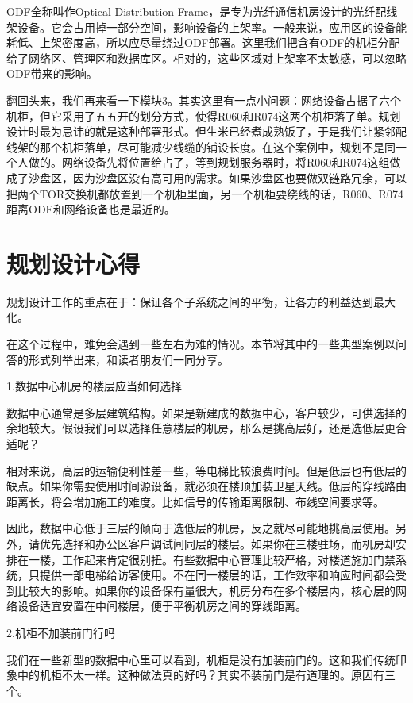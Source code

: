 \documentclass[12pt,UTF8]{ctexbook}
\begin{document}
ODF全称叫作Optical Distribution Frame，是专为光纤通信机房设计的光纤配线架设备。它会占用掉一部分空间，影响设备的上架率。一般来说，应用区的设备能耗低、上架密度高，所以应尽量绕过ODF部署。这里我们把含有ODF的机柜分配给了网络区、管理区和数据库区。相对的，这些区域对上架率不太敏感，可以忽略ODF带来的影响。

翻回头来，我们再来看一下模块3。其实这里有一点小问题：网络设备占据了六个机柜，但它采用了五五开的划分方式，使得R060和R074这两个机柜落了单。规划设计时最为忌讳的就是这种部署形式。但生米已经煮成熟饭了，于是我们让紧邻配线架的那个机柜落单，尽可能减少线缆的铺设长度。在这个案例中，规划不是同一个人做的。网络设备先将位置给占了，等到规划服务器时，将R060和R074这组做成了沙盘区，因为沙盘区没有高可用的需求。如果沙盘区也要做双链路冗余，可以把两个TOR交换机都放置到一个机柜里面，另一个机柜要绕线的话，R060、R074距离ODF和网络设备也是最近的。

\section{规划设计心得}

规划设计工作的重点在于：保证各个子系统之间的平衡，让各方的利益达到最大化。

在这个过程中，难免会遇到一些左右为难的情况。本节将其中的一些典型案例以问答的形式列举出来，和读者朋友们一同分享。

1.数据中心机房的楼层应当如何选择

数据中心通常是多层建筑结构。如果是新建成的数据中心，客户较少，可供选择的余地较大。假设我们可以选择任意楼层的机房，那么是挑高层好，还是选低层更合适呢？

相对来说，高层的运输便利性差一些，等电梯比较浪费时间。但是低层也有低层的缺点。如果你需要使用时间源设备，就必须在楼顶加装卫星天线。低层的穿线路由距离长，将会增加施工的难度。比如信号的传输距离限制、布线空间要求等。

因此，数据中心低于三层的倾向于选低层的机房，反之就尽可能地挑高层使用。另外，请优先选择和办公区客户调试间同层的楼层。如果你在三楼驻场，而机房却安排在一楼，工作起来肯定很别扭。有些数据中心管理比较严格，对楼道施加门禁系统，只提供一部电梯给访客使用。不在同一楼层的话，工作效率和响应时间都会受到比较大的影响。如果你的设备保有量很大，机房分布在多个楼层内，核心层的网络设备适宜安置在中间楼层，便于平衡机房之间的穿线距离。

2.机柜不加装前门行吗

我们在一些新型的数据中心里可以看到，机柜是没有加装前门的。这和我们传统印象中的机柜不太一样。这种做法真的好吗？其实不装前门是有道理的。原因有三个。
\end{document}
